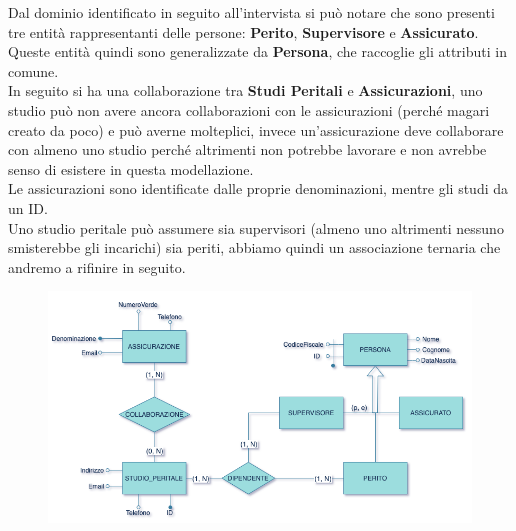 \documentclass[a4paper,12pt]{report}
\begin{document}
\clearpage
Dal dominio identificato in seguito all’intervista si può notare che sono presenti tre entità rappresentanti delle persone: \textbf{Perito}, \textbf{Supervisore} e \textbf{Assicurato}.
\\
Queste entità quindi sono generalizzate da \textbf{Persona}, che raccoglie gli attributi in comune.
\\
In seguito si ha una collaborazione tra \textbf{Studi Peritali} e \textbf{Assicurazioni}, uno studio può non avere ancora collaborazioni con le assicurazioni (perché magari creato da poco) e può averne molteplici, invece un’assicurazione deve collaborare con almeno uno studio perché altrimenti non potrebbe lavorare e non avrebbe senso di esistere in questa modellazione.
\\
Le assicurazioni sono identificate dalle proprie denominazioni, mentre gli studi da un ID. 
\\
Uno studio peritale può assumere sia supervisori (almeno uno altrimenti nessuno smisterebbe gli incarichi) sia periti, abbiamo quindi un associazione ternaria che andremo a rifinire in seguito.
\\
\begin{figure}[ht]
    \begin{center}
        \centering
        \includegraphics[width=\textwidth]{img/StudioPeritale.png}
    \end{center}
\end{figure}
\clearpage
\end{document}
